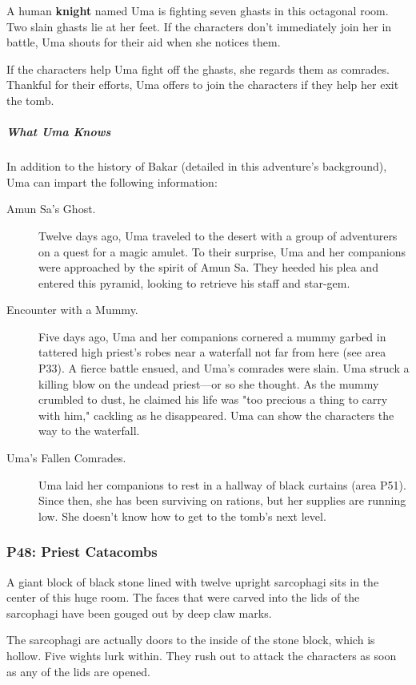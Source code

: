 \documentclass[10pt,a4paper,twoside,bg=print,twocolumn,openany,nodeprecatedcode]{dndbook}
\begin{document}
A human \textbf{knight} named Uma is fighting seven ghasts in this octagonal room. Two slain ghasts lie at her feet. If the characters don't immediately join her in battle, Uma shouts for their aid when she notices them.

If the characters help Uma fight off the ghasts, she regards them as comrades. Thankful for their efforts, Uma offers to join the characters if they help her exit the tomb.

\subparagraph{What Uma Knows}
In addition to the history of Bakar (detailed in this adventure's background), Uma can impart the following information:


\begin{description}
\item[Amun Sa's Ghost.]
Twelve days ago, Uma traveled to the desert with a group of adventurers on a quest for a magic amulet. To their surprise, Uma and her companions were approached by the spirit of Amun Sa. They heeded his plea and entered this pyramid, looking to retrieve his staff and star-gem.
\item[Encounter with a Mummy.]
Five days ago, Uma and her companions cornered a mummy garbed in tattered high priest's robes near a waterfall not far from here (see area P33). A fierce battle ensued, and Uma's comrades were slain. Uma struck a killing blow on the undead priest—or so she thought. As the mummy crumbled to dust, he claimed his life was "too precious a thing to carry with him," cackling as he disappeared. Uma can show the characters the way to the waterfall.
\item[Uma's Fallen Comrades.]
Uma laid her companions to rest in a hallway of black curtains (area P51). Since then, she has been surviving on rations, but her supplies are running low. She doesn't know how to get to the tomb's next level.
\end{description}

\subsubsection{P48: Priest Catacombs}
\begin{DndReadAloud}{}
A giant block of black stone lined with twelve upright sarcophagi sits in the center of this huge room. The faces that were carved into the lids of the sarcophagi have been gouged out by deep claw marks.

\end{DndReadAloud}

The sarcophagi are actually doors to the inside of the stone block, which is hollow. Five wights lurk within. They rush out to attack the characters as soon as any of the lids are opened.
\end{document}
